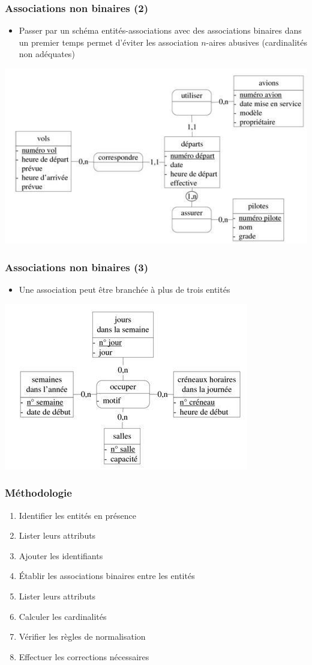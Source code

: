 \begin{frame}
  \frametitle{Associations non binaires (2)}
  \begin{itemize}
    \item Passer par un schéma entités-associations avec des associations binaires dans un premier temps
      permet d'éviter les association $n$-aires abusives (cardinalités non adéquates)
  \end{itemize}
  \begin{center}
    \includegraphics[width=0.8\linewidth]{assocation_ternaire2.jpg}
  \end{center}
\end{frame}

\begin{frame}
  \frametitle{Associations non binaires (3)}
  \begin{itemize}
    \item Une association peut être branchée à plus de trois entités
  \end{itemize}
  \begin{center}
    \includegraphics[width=0.6\linewidth]{assocation_quaternaire.jpg}
  \end{center}
\end{frame}

\begin{frame}
  \frametitle{Méthodologie}
  \begin{enumerate}
    \item Identifier les entités en présence
    \item Lister leurs attributs
    \item Ajouter les identifiants
    \item Établir les associations binaires entre les entités
    \item Lister leurs attributs
    \item Calculer les cardinalités
    \item Vérifier les règles de normalisation
    \item Effectuer les corrections nécessaires
  \end{enumerate}
\end{frame}
